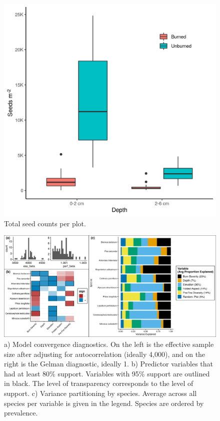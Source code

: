 \documentclass[
  12pt,
]{article}
\begin{document}
\newpage

\begin{figure}
\centering
\includegraphics{images/depth_x_burned_counts.png}
\caption{Total seed counts per plot.}
\end{figure}

\newpage

\begin{figure}
\centering
\includegraphics{images/jsdm_stuff.png}
\caption{a) Model convergence diagnostics. On the left is the effective
sample size after adjusting for autocorrelation (ideally 4,000), and on
the right is the Gelman diagnostic, ideally 1. b) Predictor variables
that had at least 80\% support. Variables with 95\% support are outlined
in black. The level of transparency corresponds to the level of support.
c) Variance partitioning by species. Average across all species per
variable is given in the legend. Species are ordered by prevalence.}
\end{figure}
\end{document}
